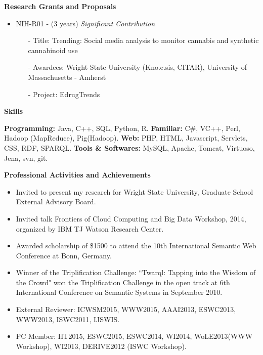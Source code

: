 \documentclass[letterpaper,11pt]{article}
\newcommand{\resheading}[1]{{\large \colorbox{mygrey}{\begin{minipage}{\textwidth}{\textbf{#1 \vphantom{p\^{E}}}}\end{minipage}}}}
\begin{document}
\resheading{Research Grants and Proposals}
\begin{itemize}
\item NIH-R01 - (3 years) \textit{Significant Contribution}
\begin{itemize}
\item[-] Title: Trending: Social media analysis to monitor cannabis and synthetic cannabinoid use
\item[-] Awardees: Wright State University (Kno.e.sis, CITAR), University of Massachusetts - Amherst 
\item[-] Project: EdrugTrends
\end{itemize}
\end{itemize}

\resheading{Skills}
\linebreak
\linebreak
	\textbf{Programming:} Java, C++, SQL, Python, R.\linebreak 
	\textbf{Familiar:} C\#, VC++, Perl,  Hadoop (MapReduce), Pig(Hadoop).\linebreak
    \textbf{Web:} PHP, HTML, Javascript, Servlets, CSS, RDF, SPARQL. \linebreak
    \textbf{Tools \& Softwares:} MySQL, Apache, Tomcat, Virtuoso, Jena, svn, git. \linebreak
\linebreak

\resheading{Professional Activities and Achievements}
\begin{itemize}
\item Invited to present my research for Wright State University, Graduate School External Advisory Board.
\item Invited talk Frontiers of Cloud Computing and Big Data Workshop, 2014, organized by IBM TJ Watson Research Center. 
\item Awarded scholarship of \$1500 to attend the 10th International Semantic Web Conference at Bonn, Germany.
\item Winner of the Triplification Challenge: ``Twarql: Tapping into the Wisdom of the Crowd" won the Triplification Challenge in the open track at 6th International Conference on Semantic Systems in September 2010. 
\item External Reviewer: ICWSM2015, WWW2015, AAAI2013, ESWC2013, WWW2013, ISWC2011, IJSWIS.
\item PC Member: HT2015, ESWC2015, ESWC2014, WI2014, WoLE2013(WWW Workshop), WI2013, DERIVE2012 (ISWC Workshop).
\end{itemize}
\end{document}
